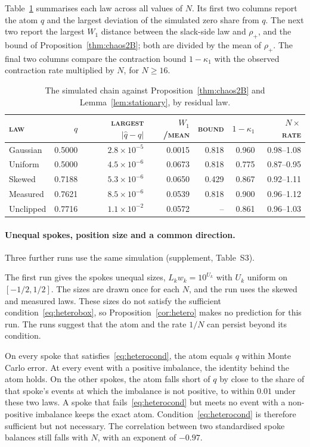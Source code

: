 \documentclass[11pt,a4paper]{article}
\DeclareRobustCommand{\thd}[1]{{\scshape\addfontfeatures{LetterSpace=1.5}\MakeLowercase{#1}}}
\theoremstyle{siphon}
\begin{document}
Table~\ref{tab:chaosverif} summarises each law across all values of $N$. Its first two columns report the atom $q$ and the largest deviation of the simulated zero share from $q$. The next two report the largest $W_1$ distance between the slack-side law and $\rho_+$, and the bound of Proposition~\ref{thm:chaos2B}; both are divided by the mean of $\rho_+$. The final two columns compare the contraction bound $1 - \kappa_1$ with the observed contraction rate multiplied by $N$, for $N \geq 16$.

\begin{table}[!htb]
\centering
\caption{The simulated chain against Proposition~\ref{thm:chaos2B} and Lemma~\ref{lem:stationary}, by residual law.}
\label{tab:chaosverif}
\begin{tabular}{@{}lrrrrrr@{}}
\toprule
\thd{Law} & $q$ & \thd{largest} $|\hat q - q|$ & $W_1$\thd{/mean} & \thd{bound} & $1 - \kappa_1$ & $N \times$ \thd{rate}  \\
\midrule
Gaussian & 0.5000 & $2.8 \times 10^{-5}$ & 0.0015 & 0.818 & 0.960 & 0.98--1.08 \\
Uniform & 0.5000 & $4.5 \times 10^{-6}$ & 0.0673 & 0.818 & 0.775 & 0.87--0.95 \\
Skewed & 0.7188 & $5.3 \times 10^{-6}$ & 0.0650 & 0.429 & 0.867 & 0.92--1.11 \\
Measured & 0.7621 & $8.5 \times 10^{-6}$ & 0.0539 & 0.818 & 0.900 & 0.96--1.12 \\
Unclipped & 0.7716 & $1.1 \times 10^{-2}$ & 0.0572 & -- & 0.861 & 0.96--1.03 \\
\bottomrule
\end{tabular}
\end{table}


\paragraph{Unequal spokes, position size and a common direction.}
Three further runs use the same simulation (supplement, Table~S3).

The first run gives the spokes unequal sizes, $L_k w_k = 10^{U_k}$ with $U_k$ uniform on $[-1/2, 1/2]$. The sizes are drawn once for each $N$, and the run uses the skewed and measured laws. These sizes do not satisfy the sufficient condition~\eqref{eq:heterobox}, so Proposition~\ref{cor:hetero} makes no prediction for this run. The runs suggest that the atom and the rate $1/N$ can persist beyond its condition.

On every spoke that satisfies~\eqref{eq:heterocond}, the atom equals $q$ within Monte Carlo error. At every event with a positive imbalance, the identity behind the atom holds. On the other spokes, the atom falls short of $q$ by close to the share of that spoke's events at which the imbalance is not positive, to within $0.01$ under these two laws. A spoke that fails~\eqref{eq:heterocond} but meets no event with a non-positive imbalance keeps the exact atom. Condition~\eqref{eq:heterocond} is therefore sufficient but not necessary. The correlation between two standardised spoke balances still falls with $N$, with an exponent of $-0.97$.
\end{document}
